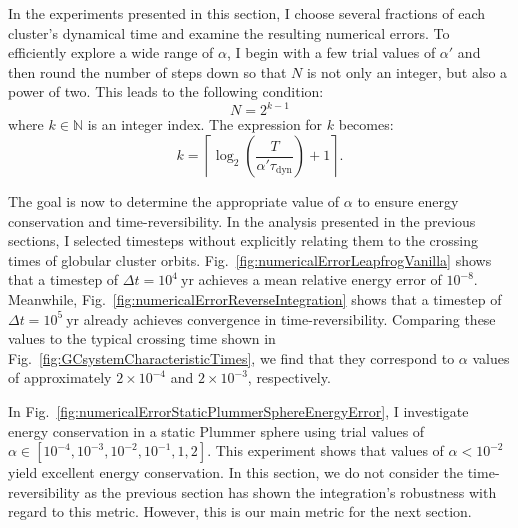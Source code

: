         In the experiments presented in this section, I choose several fractions of each cluster's dynamical time and examine the resulting numerical errors. To efficiently explore a wide range of $\alpha$, I begin with a few trial values of $\alpha'$ and then round the number of steps down so that $N$ is not only an integer, but also a power of two. This leads to the following condition:
        \begin{equation}
            N = 2^{k-1}
        \end{equation}
        where $k \in \mathbb{N}$ is an integer index. The expression for $k$ becomes:
        \begin{equation} 
            k = \left\lceil \log_2\left(\frac{T}{\alpha '  \tau_\mathrm{dyn}}\right) + 1  \right\rceil.
            \label{eq:binary_time_step_criterion}
        \end{equation}
        
        The goal is now to determine the appropriate value of $\alpha$ to ensure energy conservation and time-reversibility. In the analysis presented in the previous sections, I selected timesteps without explicitly relating them to the crossing times of globular cluster orbits. Fig.~\ref{fig:numericalErrorLeapfrogVanilla} shows that a timestep of $\Delta t = 10^4~\mathrm{yr}$ achieves a mean relative energy error of $10^{-8}$. Meanwhile, Fig.~\ref{fig:numericalErrorReverseIntegration} shows that a timestep of $\Delta t = 10^5~\mathrm{yr}$ already achieves convergence in time-reversibility. Comparing these values to the typical crossing time shown in Fig.~\ref{fig:GCsystemCharacteristicTimes}, we find that they correspond to $\alpha$ values of approximately $2 \times 10^{-4}$ and $2 \times 10^{-3}$, respectively.

        In Fig.~\ref{fig:numericalErrorStaticPlummerSphereEnergyError}, I investigate energy conservation in a static Plummer sphere using trial values of $\alpha \in [10^{-4}, 10^{-3}, 10^{-2}, 10^{-1}, 1, 2]$. This experiment shows that values of $\alpha < 10^{-2}$ yield excellent energy conservation. In this section, we do not consider the time-reversibility as the previous section has shown the integration's robustness with regard to this metric. However, this is our main metric for the next section.

